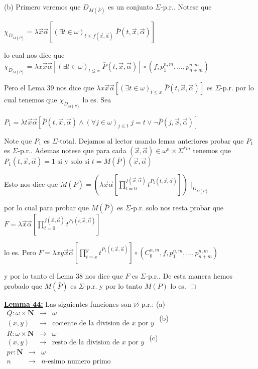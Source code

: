 (b) Primero veremos que \(D_{M(\bar{P})}\) es un conjunto \(\Sigma \)-p.r.. Notese que

\(\displaystyle \chi _{D_{M(\bar{P})}}=\lambda \vec{x}\vec{\alpha}\left[ (\exists t\in \omega )_{t\leq f(\vec{x},\vec{\alpha})}\;\bar{P}(t,\vec{x},\vec{\alpha}) \right] \)

lo cual nos dice que
\(\displaystyle \chi _{D_{M(\bar{P})}}=\lambda x\vec{x}\vec{\alpha}\left[ (\exists t\in \omega )_{t\leq x}\;\bar{P}(t,\vec{x},\vec{\alpha})\right] \circ (f,p_{1}^{n,m},...,p_{n+m}^{n,m}) \)

Pero el Lema 39 nos dice que \(\lambda x\vec{x}\vec{\alpha} \left[ (\exists t\in \omega )_{t\leq x}\;\bar{P}(t,\vec{x},\vec{\alpha}) \right] \) es \(\Sigma \)-p.r. por lo cual tenemos que \(\chi _{D_{M(\bar{P})}}\) lo es.
Sea

\(\displaystyle P_{1}=\lambda t\vec{x}\vec{\alpha}\left[ \bar{P}(t,\vec{x},\vec{\alpha} )\wedge (\forall j\in \omega )_{j\leq t}\;j=t\vee \lnot \bar{P}(j,\vec{x}, \vec{\alpha})\right] \)

Note que \(P_{1}\) es \(\Sigma \)-total. Dejamos al lector usando lemas anteriores probar que \(P_{1}\) es \(\Sigma \)-p.r.. Ademas notese que para cada \((\vec{x},\vec{\alpha})\in \omega ^{n}\times \Sigma ^{\ast m}\) tenemos que
\(\displaystyle P_{1}(t,\vec{x},\vec{\alpha})=1\text{ si y solo si }t=M(\bar{P})(\vec{x}, \vec{\alpha}) \)

Esto nos dice que
\(\displaystyle M(\bar{P})=\left( \lambda \vec{x}\vec{\alpha}\left[ \prod_{t=0}^{f(\vec{x}, \vec{\alpha})}t^{P_{1}(t,\vec{x},\vec{\alpha})}\right] \right) \mid _{D_{M( \bar{P})}} \)

por lo cual para probar que \(M(\bar{P})\) es \(\Sigma \)-p.r. solo nos resta probar que
\(\displaystyle F=\lambda \vec{x}\vec{\alpha}\left[ \prod_{t=0}^{f(\vec{x},\vec{\alpha} )}t^{P_{1}(t,\vec{x},\vec{\alpha})}\right] \)

lo es. Pero
\(\displaystyle F=\lambda xy\vec{x}\vec{\alpha}\left[ \prod_{t=x}^{y}t^{P_{1}(t,\vec{x},\vec{ \alpha})}\right] \circ (C_{0}^{n,m},f,p_{1}^{n,m},...,p_{n+m}^{n,m}) \)

y por lo tanto el Lema 38 nos dice que \(F\) es \(\Sigma \)-p.r.. De esta manera hemos probado que \(M(\bar{P})\) es \(\Sigma \)-p.r. y por lo tanto \(M(P)\) lo es. \(\Box\)

\textbf{\underline{Lemma 44:}} Las siguientes funciones son \(\varnothing \)-p.r.:
(a) \( \begin{array}{rll} Q:\omega \times \mathbf{N} & \rightarrow & \omega \\ (x,y) & \rightarrow & \text{cociente de la division de }x\text{ por }y \end{array} \)
(b) \( \begin{array}{rll} R:\omega \times \mathbf{N} & \rightarrow & \omega \\ (x,y) & \rightarrow & \text{resto de la division de }x\text{ por }y \end{array} \)
(c) \( \begin{array}{rll} pr:\mathbf{N} & \rightarrow & \omega \\ n & \rightarrow & n\text{-esimo numero primo} \end{array} \)


